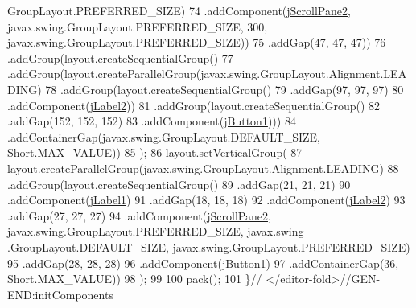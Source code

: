 \begin{DoxyCode}
      GroupLayout.PREFERRED\_SIZE)
74                     .addComponent(\mbox{\hyperlink{classinterfacessoguar_1_1verplazas_c_u04_a2c437bac63275cca364bd05ee48332e6}{jScrollPane2}}, javax.swing.GroupLayout.PREFERRED\_SIZE, 300, 
      javax.swing.GroupLayout.PREFERRED\_SIZE))
75                 .addGap(47, 47, 47))
76             .addGroup(layout.createSequentialGroup()
77                 .addGroup(layout.createParallelGroup(javax.swing.GroupLayout.Alignment.LEADING)
78                     .addGroup(layout.createSequentialGroup()
79                         .addGap(97, 97, 97)
80                         .addComponent(\mbox{\hyperlink{classinterfacessoguar_1_1verplazas_c_u04_a27d9e05008cd65fbf1961ab5fbff22b0}{jLabel2}}))
81                     .addGroup(layout.createSequentialGroup()
82                         .addGap(152, 152, 152)
83                         .addComponent(\mbox{\hyperlink{classinterfacessoguar_1_1verplazas_c_u04_a2711671a6e6008061f70195e1689943e}{jButton1}})))
84                 .addContainerGap(javax.swing.GroupLayout.DEFAULT\_SIZE, Short.MAX\_VALUE))
85         );
86         layout.setVerticalGroup(
87             layout.createParallelGroup(javax.swing.GroupLayout.Alignment.LEADING)
88             .addGroup(layout.createSequentialGroup()
89                 .addGap(21, 21, 21)
90                 .addComponent(\mbox{\hyperlink{classinterfacessoguar_1_1verplazas_c_u04_afdbe2344e261b706d86ca4f7a224cd0c}{jLabel1}})
91                 .addGap(18, 18, 18)
92                 .addComponent(\mbox{\hyperlink{classinterfacessoguar_1_1verplazas_c_u04_a27d9e05008cd65fbf1961ab5fbff22b0}{jLabel2}})
93                 .addGap(27, 27, 27)
94                 .addComponent(\mbox{\hyperlink{classinterfacessoguar_1_1verplazas_c_u04_a2c437bac63275cca364bd05ee48332e6}{jScrollPane2}}, javax.swing.GroupLayout.PREFERRED\_SIZE, javax.swing
      .GroupLayout.DEFAULT\_SIZE, javax.swing.GroupLayout.PREFERRED\_SIZE)
95                 .addGap(28, 28, 28)
96                 .addComponent(\mbox{\hyperlink{classinterfacessoguar_1_1verplazas_c_u04_a2711671a6e6008061f70195e1689943e}{jButton1}})
97                 .addContainerGap(36, Short.MAX\_VALUE))
98         );
99 
100         pack();
101     \}\textcolor{comment}{// </editor-fold>//GEN-END:initComponents}
\end{DoxyCode}
\mbox{\label{classinterfacessoguar_1_1verplazas_c_u04_a7547091247028b25efb81115983cc7f2}} 
